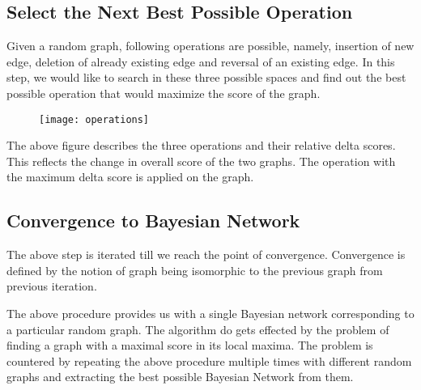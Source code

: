 \documentclass[conference]{IEEEtran}
\begin{document}
\subsection{Select the Next Best Possible Operation}
Given a random graph, following operations are possible, namely, insertion of new edge, deletion of already existing edge and reversal of an existing edge. In this step, we would like to search in these three possible spaces and find out the best possible operation that would maximize the score of the graph.
\begin{figure}[h]
\centering
\texttt{[image: operations]}
\end{figure}
\par
The above figure describes the three operations and their relative delta scores. This reflects the change in overall score of the two graphs. The operation with the maximum delta score is applied on the graph.

\subsection{Convergence to Bayesian Network}
The above step is iterated till we reach the point of convergence. Convergence is defined by the notion of graph being isomorphic to the previous graph from previous iteration.

\par
The above procedure provides us with a single Bayesian network corresponding to a particular random graph. The algorithm do gets effected by the problem of finding a graph with a maximal score in its local maxima. The problem is countered by repeating the above procedure multiple times with different random graphs and extracting the best possible Bayesian Network from them.
\end{document}
